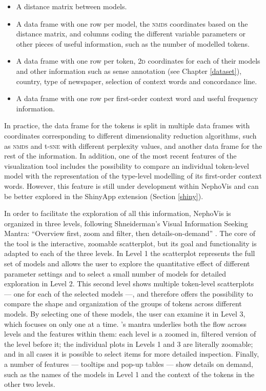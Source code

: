 \documentclass[
]{book}
\providecommand{\tightlist}{%
  \setlength{\itemsep}{0pt}\setlength{\parskip}{0pt}}
\begin{document}
\begin{itemize}
\tightlist
\item
  A distance matrix between models.
\item
  A data frame with one row per model, the \textsc{nmds} coordinates based on the distance matrix, and columns coding the different variable parameters or other pieces of useful information, such as the number of modelled tokens.
\item
  A data frame with one row per token, \textsc{2d} coordinates for each of their models and other information such as sense annotation (see Chapter \ref{dataset}), country, type of newspaper, selection of context words and concordance line.
\item
  A data frame with one row per first-order context word and useful frequency information.
\end{itemize}

In practice, the data frame for the tokens is split in multiple data frames with coordinates corresponding to different dimensionality reduction algorithms, such as \textsc{nmds} and t-\textsc{sne} with different perplexity values, and another data frame for the rest of the information. In addition, one of the most recent features of the visualization tool includes the possibility to compare an individual token-level model with the representation of the type-level modelling of its first-order context words. However, this feature is still under development within NephoVis and can be better explored in the ShinyApp extension (Section \ref{shiny}).

In order to facilitate the exploration of all this information, NephoVis is organized in three levels, following Shneiderman's Visual Information Seeking Mantra: ``Overview first, zoom and filter, then details-on-demand'' \autocite*[97]{shneiderman_1996}. The core of the tool is the interactive, zoomable scatterplot, but its goal and functionality is adapted to each of the three levels.
In Level 1 the scatterplot represents the full set of models and allows the user to explore the quantitative effect of different parameter settings and to select a small number of models for detailed exploration in Level 2.
This second level shows multiple token-level scatterplots --- one for each of the selected models ---, and therefore offers the possibility to compare the shape and organization of the groups of tokens across different models. By selecting one of these models, the user can examine it in Level 3, which focuses on only one at a time. \textcite{shneiderman_1996}'s mantra underlies both the flow across levels and the features within them: each level is a zoomed in, filtered version of the level before it; the individual plots in Levels 1 and 3 are literally zoomable; and in all cases it is possible to select items for more detailed inspection. Finally, a number of features --- tooltips and pop-up tables --- show details on demand, such as the names of the models in Level 1 and the context of the tokens in the other two levels.
\end{document}
